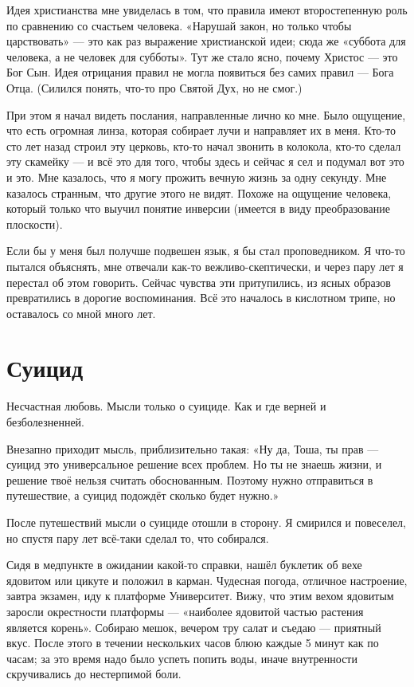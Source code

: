 \documentclass{book}
\begin{document}
Идея христианства мне увиделась в том, что правила имеют второстепенную роль по сравнению со счастьем человека.
«Нарушай закон, но только чтобы царствовать» --- это как раз выражение христианской идеи;
сюда же «суббота для человека, а не человек для субботы».
Тут же стало ясно, почему Христос --- это Бог Сын.
Идея отрицания правил не могла появиться без самих правил --- Бога Отца.
(Силился понять, что-то про Святой Дух, но не смог.)

При этом я начал видеть послания, направленные лично ко мне.
Было ощущение, что есть огромная линза, которая собирает лучи и направляет их в меня.
Кто-то сто лет назад строил эту церковь, кто-то начал звонить в колокола, кто-то сделал эту скамейку --- и всё это для того, чтобы здесь и сейчас я сел и подумал вот это и это.
Мне казалось, что я могу прожить вечную жизнь за одну секунду.
Мне казалось странным, что другие этого не видят.
Похоже на ощущение человека, который только что выучил понятие инверсии (имеется в виду преобразование плоскости).

Если бы у меня был получше подвешен язык, я бы стал проповедником.
Я что-то пытался объяснять, мне отвечали как-то вежливо-скептически, и через пару лет я перестал об этом говорить.
Сейчас чувства эти притупились, из ясных образов превратились в дорогие воспоминания.
Всё это началось в кислотном трипе, но оставалось со мной много лет.

\section*{Суицид}
Несчастная любовь.
Мысли только о суициде.
Как и где верней и безболезненней.

Внезапно приходит мысль, приблизительно такая:
«Ну да, Тоша, ты прав --- суицид это универсальное решение всех проблем.
Но ты не знаешь жизни, и решение твоё нельзя считать обоснованным.
Поэтому нужно отправиться в путешествие, а суицид подождёт сколько будет нужно.»

После путешествий мысли о суициде отошли в сторону.
Я смирился и повеселел, но спустя пару лет всё-таки сделал то, что собирался.

Сидя в медпункте в ожидании какой-то справки, нашёл буклетик об вехе ядовитом или цикуте и положил в карман.
Чудесная погода, отличное настроение, завтра экзамен, иду к платформе Университет.
Вижу, что этим вехом ядовитым заросли окрестности платформы --- «наиболее ядовитой частью растения является корень».
Собираю мешок, вечером тру салат и съедаю --- приятный вкус.
После этого в течении нескольких часов блюю каждые 5 минут как по часам;
за это время надо было успеть попить воды, иначе внутренности скручивались до нестерпимой боли.
\end{document}
